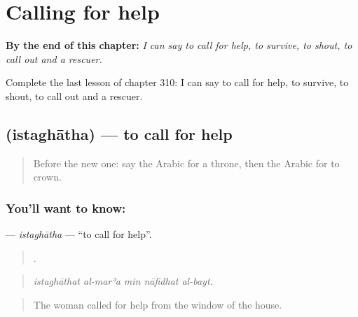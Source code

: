 
\chapter{Calling for help}
\label{ch:ar-calling-for-help}

\begin{chapteropening}
\textbf{By the end of this chapter:} \emph{I can say to call for help, to survive, to shout, to call out and a rescuer.}

Complete the last lesson of chapter 310: I can say to call for help, to survive, to shout, to call out and a rescuer.
\end{chapteropening}

\section[\texorpdfstring{\ar{استغاث} (istaghātha)}{استغاث (istaghātha)}]{ (istaghātha) — to call for help}

\label{lesson:AR-C310-istaghatha}



\begin{quote}
Before the new one: say the Arabic for a throne, then the Arabic for to crown.
\end{quote}

\subsection*{You'll want to know: }
\textbf{} — \emph{istaghātha} — \textquotedblleft{}to call for help\textquotedblright{}.

\begin{quote}
    .
\end{quote}

\begin{quote}
\emph{istaghāthat al-marʾa min nāfidhat al-bayt.}
\end{quote}

\begin{quote}
The woman called for help from the window of the house.
\end{quote}

